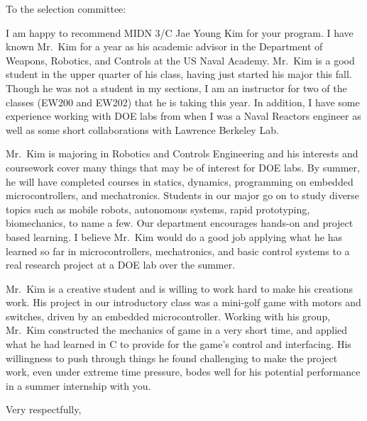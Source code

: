 \documentclass[12pt]{wrceletter}
\date{\today}
\begin{document}
\begin{letter}{}

\opening{To the selection committee:}
\raggedright %
\setlength{\parindent}{15pt} %

I am happy to recommend MIDN 3/C Jae Young Kim for your program. I have known Mr.~Kim for a year as his academic advisor in the Department of Weapons, Robotics, and Controls at the US Naval Academy. Mr.~Kim is a good student in the upper quarter of his class, having just started his major this fall. Though he was not a student in my sections, I am an instructor for two of the classes (EW200 and EW202) that he is taking this year. In addition, I have some experience working with DOE labs from when I was a Naval Reactors engineer as well as some short collaborations with Lawrence Berkeley Lab. 

Mr.~Kim is majoring in Robotics and Controls Engineering and his interests and coursework cover many things that may be of interest for DOE labs. By summer, he will have completed courses in statics, dynamics, programming on embedded microcontrollers, and mechatronics. Students in our major go on to study diverse topics such as mobile robots, autonomous systems, rapid prototyping, biomechanics, to name a few. Our department encourages hands-on and project based learning. I believe Mr.~Kim would do a good job applying what he has learned so far in microcontrollers, mechatronics, and basic control systems to a real research project at a DOE lab over the summer. 

Mr.~Kim is a creative student and is willing to work hard to make his creations work. His project in our introductory class was a mini-golf game with motors and switches, driven by an embedded microcontroller. Working with his group, Mr.~Kim constructed the mechanics of game in a very short time, and applied what he had learned in C to provide for the game's control and interfacing. His willingness to push through things he found challenging to make the project work, even under extreme time pressure, bodes well for his potential performance in a summer internship with you. 

%

\closing{Very respectfully,} %

\end{letter}
\end{document}
